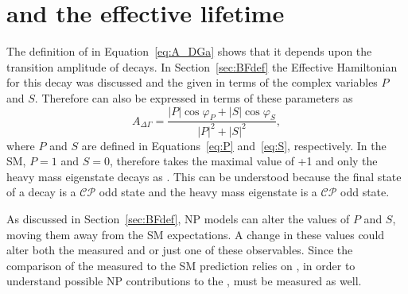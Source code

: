 \section[\ADG and the \bsmumu effective lifetime]{\boldmath{\ADG} and the \boldmaht{\bsmumu} effective lifetime}
\label{sec:ADG_EL}
The definition of \ADG in Equation~\ref{eq:A_DGa} shows that it depends upon the transition amplitude of \bsmumu decays. In Section~\ref{sec:BFdef} the Effective Hamiltonian for this decay was discussed and the \BF given in terms of the complex variables $P$ and $S$. Therefore \ADG can also be expressed in terms of these parameters as~\cite{DeBruyn:2012wk}
\begin{equation}
A_{\Delta \Gamma} = \frac{|P|\cos \varphi_P + |S| \cos \varphi_S}{|P|^2 + |S|^2},
\label{eq:NP_ADG}
\end{equation}
where $P$ and $S$ are defined in Equations~\ref{eq:P} and~\ref{eq:S}, respectively.
In the SM, $P=1$ and $S=0$, therefore \ADG takes the maximal value of +1 and only the heavy mass eigenstate decays as \bsmumu. This can be understood because the final state of a \bsmumu decay is a $\mathcal{CP}$ odd state and the heavy \bs mass eigenstate is a $\mathcal{CP}$ odd state.

As discussed in Section~\ref{sec:BFdef}, NP models can alter the values of $P$ and $S$, moving them away from the SM expectations. A change in these values could alter both the measured \BF and \ADG or just one of these observables. Since the comparison of the measured \BF to the SM prediction relies on \ADG, in order to understand possible NP contributions to the \BF, \ADG must be measured as well. 

